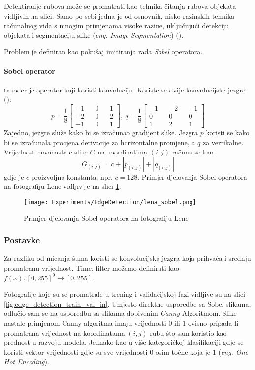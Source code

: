 Detektiranje rubova može se promatrati kao tehnika čitanja rubova objekata vidljivih na slici.
Samo po sebi jedna je od osnovnih, nisko razinskih tehnika računalnog vida s mnogim primjenama visoke razine, uključujući detekciju objekata i segmentaciju slike (\emph{eng. Image Segmentation}) (\cite{Liu_2019}).

Problem je definiran kao pokušaj imitiranja rada \emph{Sobel} operatora.

 \paragraph{Sobel operator} također je operator koji koristi konvoluciju.
 Koriste se dvije konvolucijske jezgre (\cite{Sekanina2011}):
 \[
	 p = \frac{1}{8}
	 \begin{bmatrix}
		 -1 && 0 && 1 \\
		 -2 && 0 && 2 \\
		 -1 && 0 && 1
	 \end{bmatrix}
	 ,\ 
	 q = \frac{1}{8}
	 \begin{bmatrix}
		 -1 && -2 && -1 \\
		 0 && 0 && 0 \\
		 1 && 2 && 1
	 \end{bmatrix}
 \]
Zajedno, jezgre služe kako bi se izračunao gradijent slike.
Jezgra $p$ koristi se kako bi se izračunala procjena derivacije za horizontalne promjene, a $q$ za vertikalne. \\
Vrijednost novonastale slike $G$ na koordinatima $(i, j)$ računa se kao
$$
G_{(i, j)} = c + |p_{(i, j)}| + |q_{(i, j)}|
$$
gdje je $c$ proizvoljna konstanta, npr. $c = 128$.
Primjer djelovanja Sobel operatora na fotografiju Lene vidljiv je na slici \ref{fig:lena_sobel}.

\begin{figure}
	\centering
	\texttt{[image: Experiments/EdgeDetection/lena\_sobel.png]}
	\caption{Primjer djelovanja Sobel operatora na fotografiju Lene}
	\label{fig:lena_sobel}
\end{figure}

\subsubsection{Postavke}
Za razliku od micanja šuma koristi se konvolucijska jezgra koja prihvaća i srednju promatranu vrijednost.
Time, filter možemo definirati kao $f(x): [0, 255]^9 \rightarrow [0, 255]$.

Fotografije koje su se promatrale u trening i validacijskoj fazi vidljive su na slici \ref{fig:edge_detection_train_val_in}.
Umjesto direktne usporedbe sa Sobel slikama, odlučio sam se na usporedbu sa slikama dobivenim \emph{Canny} Algoritmom.
Slike nastale primjenom Canny algoritma imaju vrijednosti $0$ ili $1$ ovisno pripada li promatrana vrijednost na koordinatama $(i, j)$ rubu što sam koristio kao prednost u razvoju modela.
Jednako kao u više-kategoričkoj klasifikaciji gdje se koristi vektor vrijednosti gdje su sve vrijednosti $0$ osim točne koja je $1$ (\emph{eng. One Hot Encoding}).

